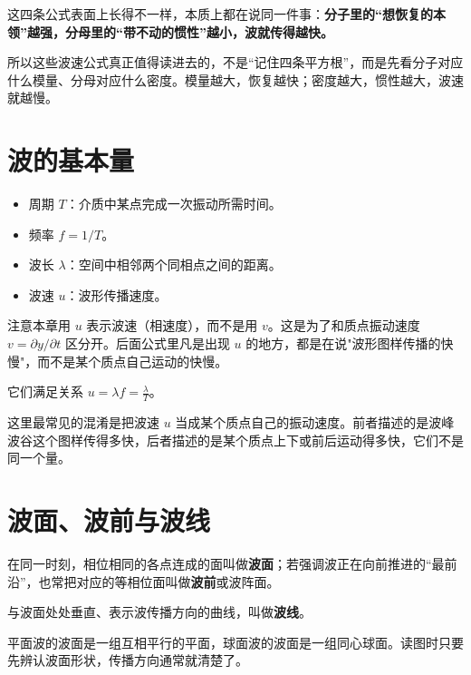 \documentclass[lang=cn,11pt]{elegantbook}
\newcommand{\bridge}[1]{\begin{note}#1\end{note}}
\begin{document}
\begin{remark}
这四条公式表面上长得不一样，本质上都在说同一件事：\textbf{分子里的“想恢复的本领”越强，分母里的“带不动的惯性”越小，波就传得越快。}
\end{remark}

\bridge{所以这些波速公式真正值得读进去的，不是“记住四条平方根”，而是先看分子对应什么模量、分母对应什么密度。模量越大，恢复越快；密度越大，惯性越大，波速就越慢。}

\section{波的基本量}

\begin{itemize}
  \item 周期 \(T\)：介质中某点完成一次振动所需时间。
  \item 频率 \(f=1/T\)。
  \item 波长 \(\lambda\)：空间中相邻两个同相点之间的距离。
  \item 波速 \(u\)：波形传播速度。
\end{itemize}

\bridge{注意本章用 \(u\) 表示波速（相速度），而不是用 \(v\)。这是为了和质点振动速度 \(v=\partial y/\partial t\) 区分开。后面公式里凡是出现 \(u\) 的地方，都是在说"波形图样传播的快慢"，而不是某个质点自己运动的快慢。}

它们满足关系 \(u=\lambda f=\frac{\lambda}{T}\)。

\begin{note}
这里最常见的混淆是把波速 \(u\) 当成某个质点自己的振动速度。前者描述的是波峰波谷这个图样传得多快，后者描述的是某个质点上下或前后运动得多快，它们不是同一个量。
\end{note}

\section{波面、波前与波线}

\begin{definition}[波面与波前]
在同一时刻，相位相同的各点连成的面叫做\textbf{波面}；若强调波正在向前推进的“最前沿”，也常把对应的等相位面叫做\textbf{波前}或波阵面。
\end{definition}

\begin{definition}[波线]
与波面处处垂直、表示波传播方向的曲线，叫做\textbf{波线}。
\end{definition}

\begin{note}
平面波的波面是一组互相平行的平面，球面波的波面是一组同心球面。读图时只要先辨认波面形状，传播方向通常就清楚了。
\end{note}
\end{document}
